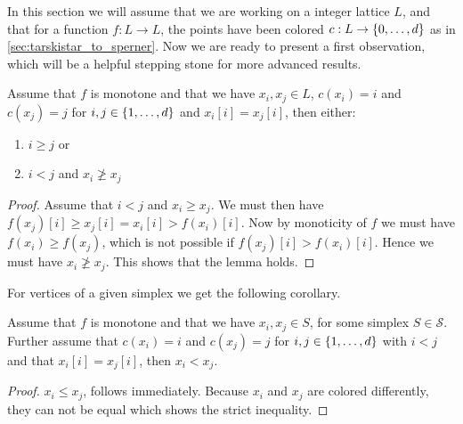 In this section we will assume that we are working on a integer lattice $L$, and that for a function $f : L \rightarrow L$, the points have been colored $c : L \rightarrow \left\{0, \dots, d\right\}$ as in \cref{sec:tarskistar_to_sperner}. Now we are ready to present a first observation, which will be a helpful stepping stone for more advanced results.

\begin{lemma}
    Assume that $f$ is monotone and that we have $x_i, x_j \in L$, $c(x_i) = i$ and $c(x_j) = j$ for $i, j \in \left\{1, \dots, d\right\}$ and $x_i[i] = x_j[i]$, then either:
    \begin{enumerate}
        \item $i \geq j$ or
        \item $i < j$  and $x_i \not\geq x_j$
    \end{enumerate}
\end{lemma}
\begin{proof}
    Assume that $i < j$ and $x_i \geq x_j$. We must then have $f(x_j)[i] \geq x_j[i] = x_i[i] > f(x_i)[i]$. Now by monoticity of $f$ we must have $f(x_i) \geq f(x_j)$, which is not possible if $f(x_j)[i] > f(x_i)[i]$. Hence we must have $x_i \not\geq x_j$. This shows that the lemma holds.
\end{proof}

For vertices of a given simplex we get the following corollary.
\begin{corollary}
    Assume that $f$ is monotone and that we have $x_i, x_j \in S$, for some simplex $S\in  \mathcal{S}$. Further assume that $c(x_i) = i$ and $c(x_j) = j$ for $i, j \in \left\{1, \dots, d\right\}$ with $i < j$ and that $x_i[i] = x_j[i]$, then $x_i < x_j$.
\end{corollary}
\begin{proof}
    $x_i \leq x_j$, follows immediately. Because $x_i$ and $x_j$ are colored differently, they can not be equal which shows the strict inequality.
\end{proof}
